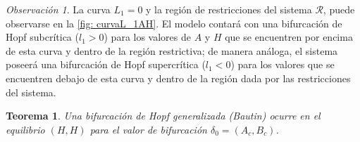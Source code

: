 \documentclass[]{article}
\newtheorem{theorem}{Teorema}[section]
\theoremstyle{remark}
\newtheorem{remark}{Observación}
\begin{document}
	\begin{remark}
		
		La curva $L_1 = 0$ y la región de restricciones del sistema $\mathcal{R}$, puede observarse en la \autoref{fig: curvaL_1AH}. El modelo contará con una bifurcación de Hopf subcrítica ($l_1 > 0$) para los valores de $A$ y $H$ que se encuentren por encima de esta curva y dentro de la región restrictiva; de manera análoga, el sistema poseerá una bifurcación de Hopf supercrítica ($l_1 < 0$) para los valores que se encuentren debajo de esta curva y dentro de la región dada por las restricciones del sistema.
	\end{remark}
	
	\begin{theorem}
		Una bifurcación de Hopf generalizada (Bautin) ocurre en el equilibrio $(H, H)$ para el valor de bifurcación $\delta_0=(A_c, B_c)$.
	\end{theorem}
\end{document}
